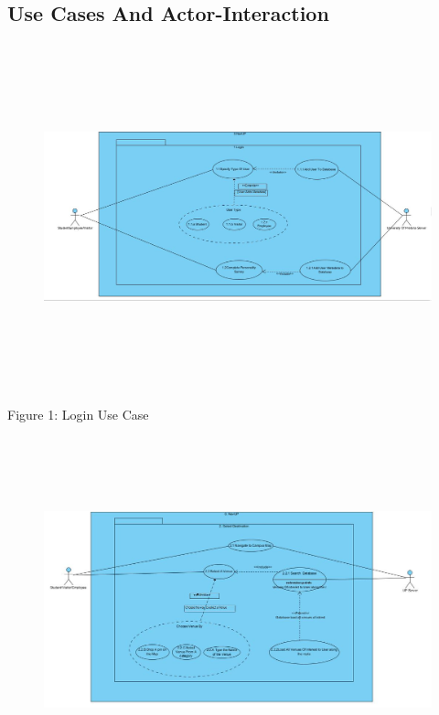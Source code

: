 \documentclass{article}
\begin{document}
		\subsection{Use Cases And Actor-Interaction}
	\begin{center}
	\begin{itemize}
			\begin{figure}[H]\includegraphics[width = \textwidth, height = 10cm]{Login.JPG} \end{figure}
			Figure 1: Login Use Case
			\begin{figure}[H]\includegraphics[width = \textwidth, height = 10cm]{Select_Destination.JPG} \end{figure}

\end{itemize}
\end{center}
\end{document}
